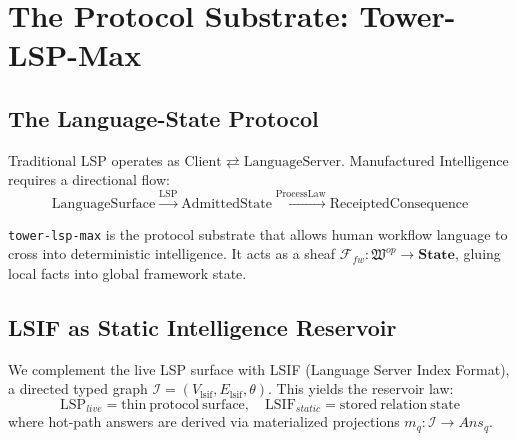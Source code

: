 
\chapter{The Protocol Substrate: Tower-LSP-Max}
\section{The Language-State Protocol}
Traditional LSP operates as $\mathrm{Client} \rightleftarrows \mathrm{LanguageServer}$. Manufactured Intelligence requires a directional flow:
\begin{equation}
\mathrm{LanguageSurface} \xrightarrow{\mathrm{LSP}} \mathrm{AdmittedState} \xrightarrow{\mathrm{ProcessLaw}} \mathrm{ReceiptedConsequence}
\end{equation}

\texttt{tower-lsp-max} is the protocol substrate that allows human workflow language to cross into deterministic intelligence. It acts as a sheaf $\mathcal{F}_{fw}: \mathfrak{W}^{op} \to \mathbf{State}$, gluing local facts into global framework state.

\section{LSIF as Static Intelligence Reservoir}
We complement the live LSP surface with LSIF (Language Server Index Format), a directed typed graph $\mathcal{I} = (V_{\mathrm{lsif}},E_{\mathrm{lsif}},\theta)$. This yields the reservoir law:
\begin{equation}
\boxed{\mathrm{LSP}_{live} = \mathrm{thin\ protocol\ surface},\quad \mathrm{LSIF}_{static} = \mathrm{stored\ relation\ state}}
\end{equation}
where hot-path answers are derived via materialized projections $m_q: \mathcal{I} \to Ans_q$.
